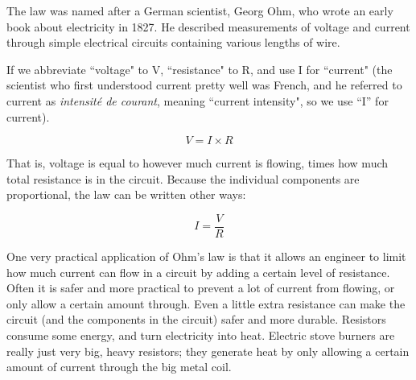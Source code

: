 The law was named after a German scientist, Georg Ohm, who wrote an early book about electricity in  1827. He described measurements of voltage and current through simple electrical circuits containing various lengths of wire.

If we abbreviate ``voltage" to V, ``resistance" to R, and use I for ``current" (the scientist who first understood current pretty well was French, and he referred to current as \emph{intensit{\'e} de courant}, meaning ``current intensity", so we use ``I'' for current).

\begin{equation}
V = I \times R
\end{equation}


That is, voltage is equal to however much current is flowing, times how much total resistance is in the circuit. Because the individual components are proportional, the law can be written other ways:

\begin{equation}
I =  \frac{V}{R}
\end{equation}

One very practical application of Ohm's law is that it allows an engineer to limit how much current can flow in a circuit by adding a certain level of resistance. Often it is safer and more practical to prevent a lot of current from flowing, or only allow a certain amount through. Even a little extra resistance can make the circuit (and the components in the circuit) safer and more durable. Resistors consume some energy, and turn electricity into heat. Electric stove burners are really just very big, heavy resistors; they generate heat by only allowing a certain amount of current through the big metal coil. 
